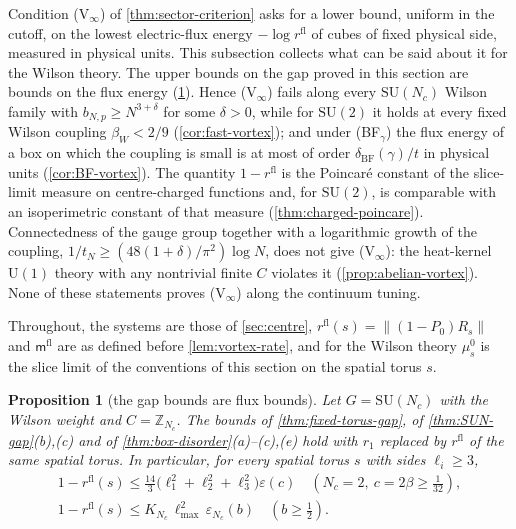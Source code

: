 \documentclass[11pt,a4paper]{amsart}
\newtheorem{proposition}[theorem]{Proposition}
\theoremstyle{definition}
\theoremstyle{remark}
\numberwithin{equation}{section}
\newcommand{\Z}{\mathbb{Z}}          %
\newcommand{\norm}[1]{\lVert #1\rVert}     %
\newcommand{\SU}{\mathrm{SU}}              %
\newcommand{\U}{\mathrm{U}}                %
\newcommand{\betaW}{\beta_{W}}             %
\begin{document}
Condition \textup{(V$_\infty$)} of \cref{thm:sector-criterion} asks for a lower bound, uniform in the cutoff, on the lowest electric-flux energy $-\log r^{\mathrm{fl}}$ of cubes of fixed physical side, measured in physical units. This subsection collects what can be said about it for the Wilson theory. The upper bounds on the gap proved in this section are bounds on the flux energy (\cref{prop:flux-form}). Hence \textup{(V$_\infty$)} fails along every $\SU(N_c)$ Wilson family with $b_{N,p}\ge N^{3+\delta}$ for some $\delta>0$, while for $\SU(2)$ it holds at every fixed Wilson coupling $\betaW<2/9$ (\cref{cor:fast-vortex}); and under \textup{(BF$_\gamma$)} the flux energy of a box on which the coupling is small is at most of order $\delta_{\mathrm{BF}}(\gamma)/t$ in physical units (\cref{cor:BF-vortex}). The quantity $1-r^{\mathrm{fl}}$ is the Poincar\'e constant of the slice-limit measure on centre-charged functions and, for $\SU(2)$, is comparable with an isoperimetric constant of that measure (\cref{thm:charged-poincare}). Connectedness of the gauge group together with a logarithmic growth of the coupling, $1/t_N\ge(48(1+\delta)/\pi^2)\log N$, does not give \textup{(V$_\infty$)}: the heat-kernel $\U(1)$ theory with any nontrivial finite $C$ violates it (\cref{prop:abelian-vortex}). None of these statements proves \textup{(V$_\infty$)} along the continuum tuning.

Throughout, the systems are those of \cref{sec:centre}, $r^{\mathrm{fl}}(s)=\norm{(1-P_0)R_s}$ and $\mathsf m^{\mathrm{fl}}$ are as defined before \cref{lem:vortex-rate}, and for the Wilson theory $\mu^0_s$ is the slice limit of the conventions of this section on the spatial torus $s$.

\begin{proposition}[the gap bounds are flux bounds]\label{prop:flux-form}
Let $G=\SU(N_c)$ with the Wilson weight and $C=\Z_{N_c}$. The bounds of \cref{thm:fixed-torus-gap}, of \cref{thm:SUN-gap}\textup{(b),(c)} and of \cref{thm:box-disorder}\textup{(a)--(c),(e)} hold with $r_1$ replaced by $r^{\mathrm{fl}}$ of the same spatial torus. In particular, for every spatial torus $s$ with sides $\ell_i\ge3$,
\begin{gather*}
1-r^{\mathrm{fl}}(s)\le\tfrac{14}3\bigl(\ell_1^2+\ell_2^2+\ell_3^2\bigr)\varepsilon(c)\quad(N_c=2,\ c=2\beta\ge\tfrac1{32}),\\
1-r^{\mathrm{fl}}(s)\le K_{N_c}\,\ell_{\max}^2\,\varepsilon_{N_c}(b)\quad(b\ge\tfrac12).
\end{gather*}
\end{proposition}
\end{document}
